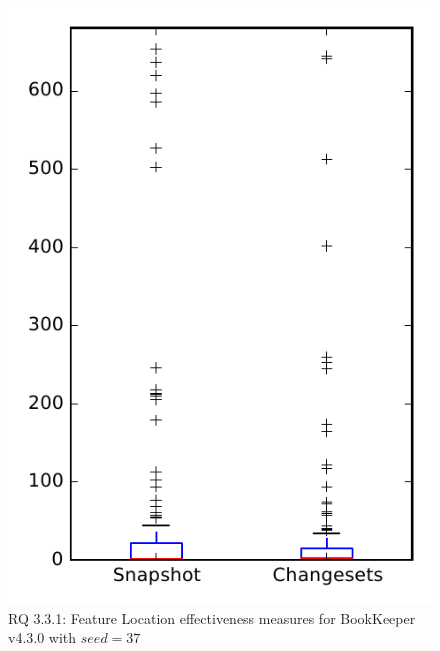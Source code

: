 
\begin{figure}
\centering
\includegraphics[height=0.4\textheight]{figures/flt_seed/rq1_bookkeeper_37}
\caption{RQ 3.3.1: Feature Location effectiveness measures for BookKeeper v4.3.0 with $seed=37$}
\label{fig:flt_seed:rq1:bookkeeper}
\end{figure}
